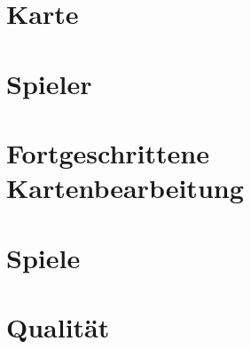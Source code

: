 \documentclass[
  paper=a4,
  fontsize=12pt,
  twoside,
  BCOR=8mm,
  DIV=calc,
  headings=small,
  parskip=half-,
  footnotes=multiple,
  numbers=noendperiod,
  ngerman,
]{scrbook}
\begin{document}
\part{Karte}





\part{Spieler}






\part{Fortgeschrittene Kartenbearbeitung}



\part{Spiele}


\part{Qualität}









\backmatter
\printindex
\end{document}
